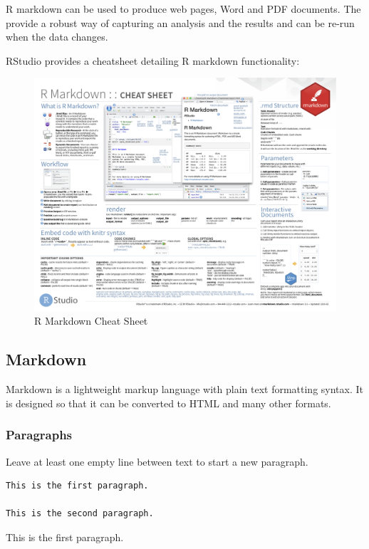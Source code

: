 \documentclass[]{book}
\theoremstyle{definition}
\theoremstyle{definition}
\theoremstyle{definition}
\theoremstyle{remark}
\begin{document}
R markdown can be used to produce web pages, Word and PDF documents. The
provide a robust way of capturing an analysis and the results and can be
re-run when the data changes.

RStudio provides a cheatsheet detailing R markdown functionality:

\begin{figure}

{\centering \includegraphics[width=0.8\linewidth]{images/rmarkdown-cheatsheet-2.0} 

}

\caption{R Markdown Cheat Sheet}\label{fig:rmarkdown-cheatsheet}
\end{figure}

\subsection{Markdown}\label{markdown}

Markdown is a lightweight markup language with plain text formatting
syntax. It is designed so that it can be converted to HTML and many
other formats.

\subsubsection{Paragraphs}\label{paragraphs}

Leave at least one empty line between text to start a new paragraph.

\begin{verbatim}
This is the first paragraph.

This is the second paragraph.
\end{verbatim}

This is the first paragraph.
\end{document}
